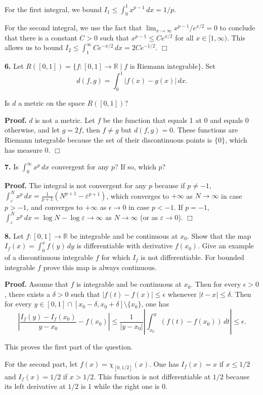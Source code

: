 \documentclass{article}
\begin{document}
For the first integral, we bound
$I_1 \le  \int_0^{1} x^{p-1} \,dx = 1/p$.

For the second integral, we use the fact that
$\lim_{x\to \infty } x^{p-1}/e^{x/2} = 0$ to conclude that there is a
constant $C > 0$ such that $x^{p-1}\le Ce^{x/2}$ for all
$x\in [1, \infty)$. This allows us to bound
$I_2\le \int_1^{\infty} Ce^{-x/2} \,dx= 2Ce^{-1/2}$. $\Box$

    \textbf{6.} Let
$R([0, 1]) = \{f : [0, 1] → \mathbb{R} \mid f \text{ is Riemann integrable}\}$.
Set \[d(f,g) = \int_0^1 |f (x) − g(x)|\,dx.\]

Is $d$ a metric on the space $R([0, 1])$?

    \textbf{Proof.} $d$ is not a metric. Let $f$ be the function that equals
1 at 0 and equals 0 otherwise, and let $g = 2f$, then $f \neq g$ but
$d(f, g) = 0$. These functions are Riemann integrable because the set of
their discontinuous points is $\{0\}$, which has measure $0$. $\Box$

    \textbf{7.} Is $\int_0^{\infty}x^p \,dx$ convergent for any $p$? If so,
which $p$?

    \textbf{Proof.} The integral is not convergent for any $p$ because if
$p \ne -1$,
$\int_{\varepsilon}^{N}x^p \,dx = \frac{1}{p+1}(N^{p+1}-\varepsilon^{p+1})$,
which converges to $+\infty$ as $N \to \infty$ in case $p > -1$, and
converges to $+\infty$ as $\epsilon\to 0$ in case $p < -1$. If $p=-1$,
$\int_\varepsilon^{N}x^p \,dx = \log N-\log \varepsilon \to \infty$ as
$N \to \infty$ (or as $\varepsilon \to 0$). $\Box$

    \textbf{8.} Let $f : [0, 1] → \mathbb{R}$ be integrable and be
continuous at $x_0$. Show that the map $I_f (x) = \int_0^x f (y)\, dy$
is differentiable with derivative $f (x_0 )$. Give an example of a
discontinuous integrable $f$ for which $I_f$ is not differentiable. For
bounded integrable $f$ prove this map is always continuous.

    \textbf{Proof.} Assume that $f$ is integrable and be continuous at
$x_0$. Then for every $\epsilon>0$, there exists a $\delta>0$ such that
$|f(t)-f(x)|\le \epsilon$ whenever $|t-x|\le \delta$. Then for every
$y\in [0, 1]\cap [x_0-\delta, x_0+\delta]\setminus \{x_0\}$, one has
\[\left|\frac{I_f(y) - I_f(x_0)}{y-x_0}-f(x_0)\right| \le \frac{1}{|y-x_0|}\left|\int_{x_0}^{y} (f(t) - f(x_0))\,dt\right|\le \epsilon.\]

This proves the first part of the question.

For the second part, let $f(x)  = \chi_{[0, 1/2]}(x)$. One has
$I_f(x) = x$ if $x \le 1/2$ and $I_f(x) = 1/2$ if $x > 1/2$. This
function is not differentiable at $1/2$ because its left derivative at
$1/2$ is $1$ while the right one is $0$.
\end{document}
